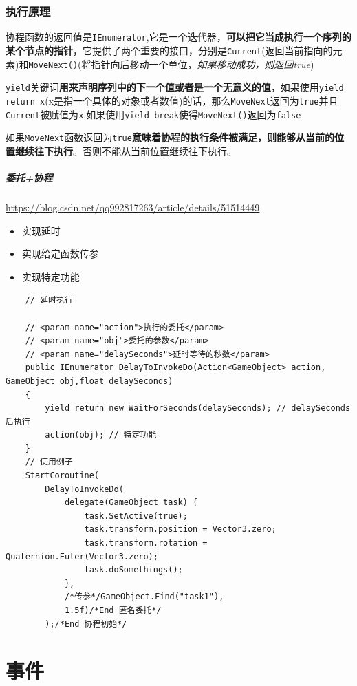 \documentclass[UTF8,a4paper,12pt]{ctexbook}
\begin{document}
		\subsection{执行原理}
			协程函数的返回值是\verb|IEnumerator|,它是一个迭代器，\textbf{可以把它当成执行一个序列的某个节点的指针}，它提供了两个重要的接口，分别是\verb|Current|(返回当前指向的元素)和\verb|MoveNext()|(将指针向后移动一个单位，\textit{如果移动成功，则返回true})
			
			\verb|yield|关键词\textbf{用来声明序列中的下一个值或者是一个无意义的值}，如果使用\verb|yield return x|(x是指一个具体的对象或者数值)的话，那么\verb|MoveNext|返回为\verb|true|并且\verb|Current|被赋值为\verb|x|,如果使用\verb|yield break|使得\verb|MoveNext()|返回为\verb|false|
			
			如果\verb|MoveNext|函数返回为\verb|true|\textbf{意味着协程的执行条件被满足，则能够从当前的位置继续往下执行}。否则不能从当前位置继续往下执行。	

	\paragraph{委托+协程}
		\url{https://blog.csdn.net/qq992817263/article/details/51514449}
		
		\begin{itemize}
			\item 实现延时
			\item 实现给定函数传参
			\item 实现特定功能
		\end{itemize}
	
		\begin{lstlisting}
	// 延时执行

	// <param name="action">执行的委托</param>
	// <param name="obj">委托的参数</param>
	// <param name="delaySeconds">延时等待的秒数</param>
	public IEnumerator DelayToInvokeDo(Action<GameObject> action, GameObject obj,float delaySeconds)
	{
		yield return new WaitForSeconds(delaySeconds); // delaySeconds 后执行
		action(obj); // 特定功能
	}
	// 使用例子
	StartCoroutine(
		DelayToInvokeDo(
			delegate(GameObject task) {
				task.SetActive(true);
				task.transform.position = Vector3.zero;
				task.transform.rotation = Quaternion.Euler(Vector3.zero);
				task.doSomethings();
			},
			/*传参*/GameObject.Find("task1"),
			1.5f)/*End 匿名委托*/
		);/*End 协程初始*/
		\end{lstlisting}
		
\chapter{事件}
\end{document}
